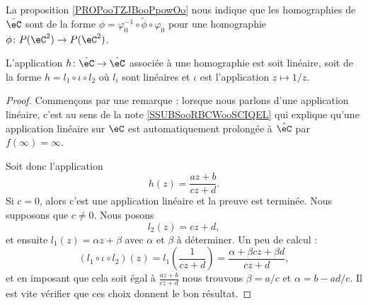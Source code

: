 La proposition \ref{PROPooTZJBooPpowOo} nous indique que les homographies de \( \hat \eC\) sont de la forme \( \phi=\varphi_0^{-1}\circ\tilde \phi\circ\varphi_0\) pour une homographie \( \phi\colon P(\eC^2)\to P(\eC^2)\).



\begin{proposition}      \label{PROPooSQFOooRginjJ}
    L'application \( h\colon \hat\eC\to \hat \eC\) associée à une homographie est soit linéaire, soit de la forme \( h=l_1\circ \iota\circ l_2\) où \( l_i\) sont linéaires et \( \iota\) est l'application \( z\mapsto 1/z\).
\end{proposition}

\begin{proof}
    Commençons par une remarque : lorsque nous parlons d'une application linéaire, c'est au sens de la note \ref{SSUBSooRBCWooSCIQEL} qui explique qu'une application linéaire sur \( \eC\) est automatiquement prolongée à \( \hat \eC\) par \( f(\infty)=\infty\).

    Soit donc l'application 
    \begin{equation}
        h(z)=\frac{ az+b }{ cz+d }.
    \end{equation}
    Si \( c=0\), alors c'est une application linéaire et la preuve est terminée. Nous supposons que \( c\neq 0\). Nous posons
    \begin{equation}
        l_2(z)=cz+d,
    \end{equation}
    et ensuite \( l_1(z)=\alpha z+\beta\) avec \( \alpha\) et \( \beta\) à déterminer. Un peu de calcul :
    \begin{equation}
        (l_1\circ \iota\circ l_2)(z)=l_1\left( \frac{1}{ cz+d } \right)=\frac{ \alpha+\beta c z+\beta d }{ cz+d },
    \end{equation}
    et en imposant que cela soit égal à \( \frac{ az+b }{ cz+d }\) nous trouvons \( \beta=a/c\) et \( \alpha=b-ad/c\). Il est vite vérifier que ces choix donnent le bon résultat.
\end{proof}

